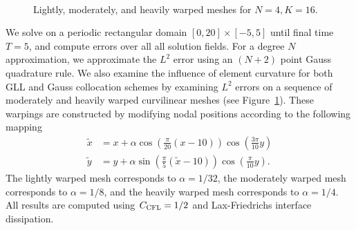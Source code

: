 \documentclass[review,onefignum,onetabnum,final]{siamart171218}
\renewcommand{\tilde}{\widetilde}
\newcommand{\LRp}[1]{\left( #1 \right)}
\begin{document}
\begin{figure}
\centering
{}
\hspace{1em}
\\
\caption{Lightly, moderately, and heavily warped meshes for $N=4, K= 16$.  }
\label{fig:warp2d}
\end{figure}

We solve on a periodic rectangular domain $[0, 20] \times [-5,5]$ until final time $T=5$, and compute errors over all all solution fields.  For a degree $N$ approximation, we approximate the $L^2$ error using an $(N+2)$ point Gauss quadrature rule.  We also examine the influence of element curvature for both GLL and Gauss collocation schemes by examining $L^2$ errors on a sequence of moderately and heavily warped curvilinear meshes (see Figure~\ref{fig:warp2d}).  These warpings are constructed by modifying nodal positions according to the following mapping
\begin{align*}
\tilde{x} &= x + \alpha\cos\LRp{\frac{\pi}{20}(x-10)}\cos\LRp{\frac{3\pi}{10}y}\\
\tilde{y} &= y + \alpha\sin\LRp{\frac{\pi}{5}(\tilde{x}-10)}\cos\LRp{\frac{\pi}{10}y}.
\end{align*}
The lightly warped mesh corresponds to $\alpha = 1/32$, the moderately warped mesh corresponds to $\alpha = 1/8$, and the heavily warped mesh corresponds to $\alpha = 1/4$.  All results are computed using $C_{\rm CFL} = 1/2$ and Lax-Friedrichs interface dissipation.  
\end{document}
